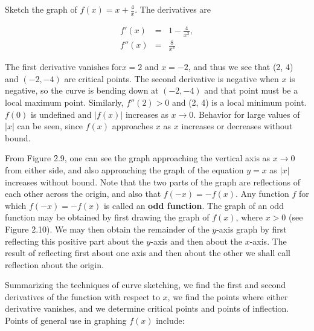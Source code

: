 \begin{example} Sketch the graph of $f(x) = x + \frac{4}{x}$. The derivatives are 

\begin{eqnarray*}
f'(x) &=& 1- \frac{4}{x^2},\\
f''(x) &=& \frac{8}{x^3}
\end{eqnarray*}

\noindent The first derivative vanishes for$x = 2$ and $x = -2$, and thus we see that (2, 4) and $(-2, -4)$ are critical points. The second derivative is negative when $x$ is negative, so the curve is bending down at $(-2, -4)$ and that point must be a local maximum point. Similarly, $f''(2) > 0$ and (2, 4) is a local minimum point. $f(0)$ is undefined and $|f(x)|$ increases as $x \rightarrow 0$. Behavior for large values of $|x|$ can be seen, since $f(x)$ approaches $x$ as $x$ increases or decreases without bound.


From Figure \f{2.9}, one can see the graph approaching the vertical axis as $x \rightarrow 0$ from either side, and also approaching the graph of the equation $y = x$ as $|x|$ increases without bound. Note that the two parts of the graph are reflections of each other across the origin, and also that $f(-x) = -f(x)$. Any function $f$ for which $f(-x) = -f(x)$ is called an \textbf{odd function}.  The graph of an odd function may be obtained by first drawing the graph of $f(x)$, where $x > 0$ (see Figure \f{2.10}). We may then obtain the remainder of the $y$-axis graph by first reflecting this positive part about the $y$-axis and then about the $x$-axis. The result of reflecting first about one axis and then about the other we shall call reflection about the origin.
\end{example}


Summarizing the techniques of curve sketching, we find the first and second derivatives of the function with respect to $x$, we find the points where either derivative vanishes, and we determine critical points and points of inflection. Points of general use in graphing $f(x)$ include:
\smallskip

